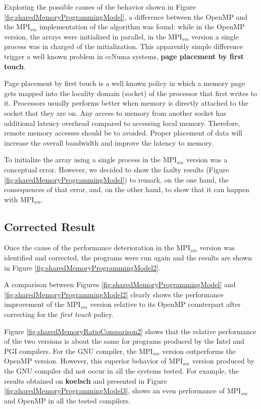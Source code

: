 Exploring the possible causes of the behavior shown in Figure \ref{fig:sharedMemoryProgrammingModel}, a difference between the OpenMP and the MPI$_{sm}$ implementation of the algorithm was found: while in the OpenMP version, the arrays were initialized in parallel, in the MPI$_{sm}$ version a single process was in charged of the initialization. This apparently simple difference trigger a well known problem in ccNuma systems, \textbf{page placement by first touch}. 

\medskip

Page placement by first touch is a well known policy in which a memory page gets mapped into the locality domain (socket) of the processor that first writes to it. Processors usually performs better when memory is directly attached to the socket that they are on. Any access to memory from another socket has additional latency overhead compared to accessing local memory. Therefore, remote memory accesses should be to avoided. Proper placement of data will increase the overall bandwidth and improve the latency to memory.

\medskip

To initialize the array using a single process in the MPI$_{sm}$ version was a conceptual error. However, we decided to show the faulty results (Figure \ref{fig:sharedMemoryProgrammingModel}) to remark, on the one hand, the consequences of that error, and, on the other hand, to show that it can happen with MPI$_{sm}$.

\subsection*{Corrected Result}

Once the cause of the performance deterioration in the MPI$_{sm}$ version was identified and corrected, the programs were run again and the results are shown in Figure \ref{fig:sharedMemoryProgrammingModel2}.

\medskip

A comparison between Figures \ref{fig:sharedMemoryProgrammingModel} and \ref{fig:sharedMemoryProgrammingModel2} clearly shows the performance improvement of the MPI$_{sm}$ version relative to its OpenMP counterpart after correcting for the \emph{first touch} policy. 

\medskip

Figure \ref{fig:sharedMemoryRatioComparison2} shows that the relative performance of the two versions is about the same for programs produced by the Intel and PGI compilers. For the GNU compiler, the MPI$_{sm}$ version outperforms the OpenMP version. However, this superior behavior of MPI$_{sm}$ version produced by the GNU compiler did not occur in all the systems tested. For example, the results obtained on \textbf{koelsch} and presented in Figure \ref{fig:sharedMemoryProgrammingModel3}, shows an even performance of MPI$_{sm}$ and OpenMP in all the tested compilers.


